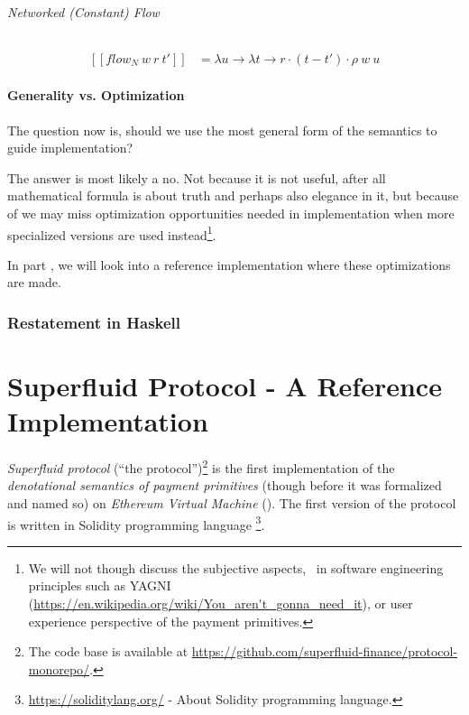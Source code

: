 \paragraph{Networked (Constant) Flow}

\begin{equation}
    \begin{split}
        [\![flow_N\ w\ r\ t']\!] &=
        \lambda u \rightarrow \lambda t \rightarrow r \cdot (t - t') \cdot \rho\ w\ u
    \end{split}
\end{equation}

\subsection{Generality vs. Optimization}

The question now is, should we use the most general form of the semantics to guide implementation?

The answer is most likely a no. Not because it is not useful, after all mathematical formula is
about truth and perhaps also elegance in it, but because of we may miss optimization opportunities
needed in implementation when more specialized versions are used instead\footnote{We will not though
discuss the subjective aspects, \eg\ in software engineering principles such as YAGNI
(\url{https://en.wikipedia.org/wiki/You_aren't_gonna_need_it}), or user experience perspective of
the payment primitives.}.

In part \ref{part:sf}, we will look into a reference implementation where these optimizations are
made.

\section{Restatement in Haskell}



\part{Superfluid Protocol - A Reference Implementation}\label{part:sf}

\textit{Superfluid protocol} (``the protocol'')\footnote{The code base is available
at \url{https://github.com/superfluid-finance/protocol-monorepo/}.} is the first implementation of
the \textit{denotational semantics of payment primitives} (though before it was formalized and named
so) on \textit{Ethereum Virtual Machine} (\cite{wood2014ethereum}). The first version of the protocol
is written in Solidity programming language \footnote{\url{https://soliditylang.org/} - About
Solidity programming language.}.

